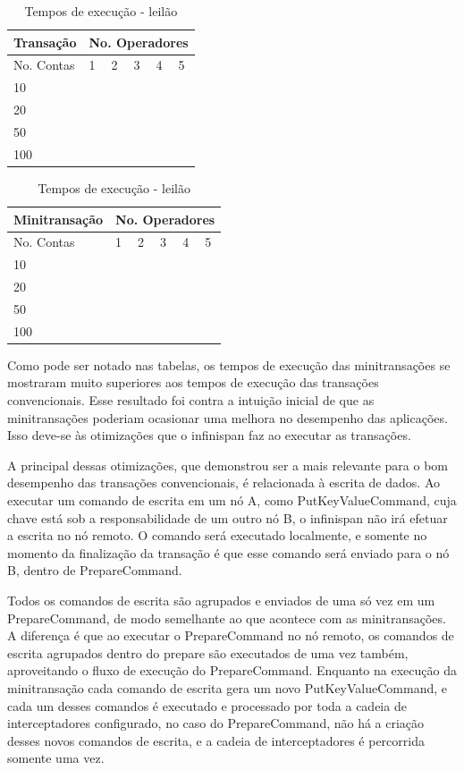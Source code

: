 \documentclass[11pt,twoside,a4paper]{book}
\begin{document}
\begin{table}[h]
	\centering
    	\begin{tabular}{|l|l|l|l|l|l|}
		\hline
		\textbf{Transação} & \multicolumn{5}{l}{No. Operadores} \\
		\hline
		No. Contas & 1 & 2 & 3 & 4 & 5 \\
		\hline
		10 &  &  &  &  &  \\
		\hline
		20 &  &  &  &  &  \\
		\hline
		50 &  &  &  &  &  \\
		\hline
		100 &  &  &  &  &  \\
		\hline
	\end{tabular}
	\begin{tabular}{|l|l|l|l|l|l|}
		\hline
		\textbf{Minitransação} & \multicolumn{5}{l}{No. Operadores} \\
		\hline
		No. Contas & 1 & 2 & 3 & 4 & 5 \\
		\hline
		10 &  &  &  &  &  \\
		\hline
		20 &  &  &  &  &  \\
		\hline
		50 &  &  &  &  &  \\
		\hline
		100 &  &  &  &  &  \\
		\hline
	\end{tabular}
	\caption{Tempos de execução - leilão}
	\label{tab:tempos_auction}
\end{table}

Como pode ser notado nas tabelas, os tempos de execução das minitransações se mostraram muito superiores aos tempos de execução das transações convencionais. Esse resultado foi contra a intuição inicial de que as minitransações poderiam ocasionar uma melhora no desempenho das aplicações. Isso deve-se às otimizações que o infinispan faz ao executar as transações. 

A principal dessas otimizações, que demonstrou ser a mais relevante para o bom desempenho das transações convencionais, é relacionada à escrita de dados. Ao executar um comando de escrita em um nó A, como PutKeyValueCommand, cuja chave está sob a responsabilidade de um outro nó B, o infinispan não irá efetuar a escrita no nó remoto. O comando será executado localmente, e somente no momento da finalização da transação é que esse comando será enviado para o nó B, dentro de PrepareCommand.

Todos os comandos de escrita são agrupados e enviados de uma só vez em um PrepareCommand, de modo semelhante ao que acontece com as minitransações. A diferença é que ao executar o PrepareCommand no nó remoto, os comandos de escrita agrupados dentro do prepare são executados de uma vez também, aproveitando o fluxo de execução do PrepareCommand. Enquanto na execução da minitransação cada comando de escrita gera um novo PutKeyValueCommand, e cada um desses comandos é executado e processado por toda a cadeia de interceptadores configurado, no caso do PrepareCommand, não há a criação desses novos comandos de escrita, e a cadeia de interceptadores é percorrida somente uma vez.
\end{document}
